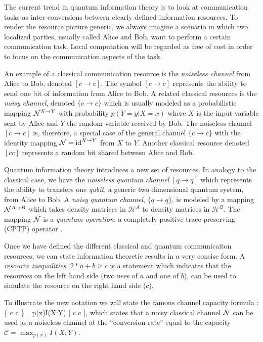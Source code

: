 \documentclass[aps,11pt,twoside,letterpaper]{article}
\def\cH{\mathcal{H}}
\begin{document}
			The current trend in quantum information theory is to look at communication tasks as inter-conversions
			between clearly defined information resources. 
			To render the resource picture generic, we always imagine a scenario in which two localized parties,
			usually called Alice and Bob, want to perform a certain communication task.
			Local computation will be regarded as free of cost in order to focus on the communication aspects 
			of the task. 
			
			An example of a classical communication resource is the \emph{noiseless channel} from 
			Alice to Bob, denoted $[c\to c]$. 
			The symbol $[c \to c]$ represents the ability to send one bit of information from Alice to Bob.
			A related classical resources is the \emph{noisy channel}, denoted $\{c\to c\}$ which is usually 
			modeled as a probabilistic mapping ${\cal N}^{X \to Y}$ with probability $p(Y=y|X=x)$ where
			$X$ is the input variable sent by Alice and $Y$ the random variable received by Bob.
			The noiseless channel $[c\to c]$ is, therefore, a special case of the general channel $\{c\to c\}$ 
			with the identity mapping ${\cal N} = \operatorname{id}^{X \to Y}$ from $X$ to $Y$.
			Another classical resource denoted $[cc]$ represents a random bit shared between Alice and Bob.
			
			Quantum information theory introduces a new set of resources. 
			In analogy to the classical case, we have the \emph{noiseless quantum channel} $[q \to q]$ which 
			represents the ability to transfers one \emph{qubit}, a generic two dimensional quantum system, 
			from Alice to Bob.
			A \emph{noisy quantum channel}, $\{q \to q\}$, is modeled by a mapping ${\cal N}^{A \to B}$ 
			which takes density matrices in $\cH^A$ to density matrices in $\cH^B$.
			The mapping ${\cal N}$ is a \emph{quantum operation}: a completely positive trace preserving (CPTP) 
			operator \cite{NC04}.
		
            Once we have defined the different classical and quantum communicaiton resources,
            we can state information theoretic results in a very consise form.
            A \emph{resource inequalities}, $2*a+b \geq c$ is a statement which indicates that 
            the resources on the left hand side (two uses of $a$ and one of $b$),
            can be used to simulate the resource on the right hand side ($c$).

            To illustrate the new notation we will state the famous channel
            capacity formula \cite{S48}:
            \be
                \{ c \to c \} \geq \max_{p(x)}I(X;Y) [  c \to c ],
            \ee
            which states that a noisy classical channel ${\cal N}$ can be used as a noiseless channel
            at the ``conversion rate'' equal to the capacity $\mathcal{C} = \max_{p(x)}I(X;Y)$.
\end{document}
